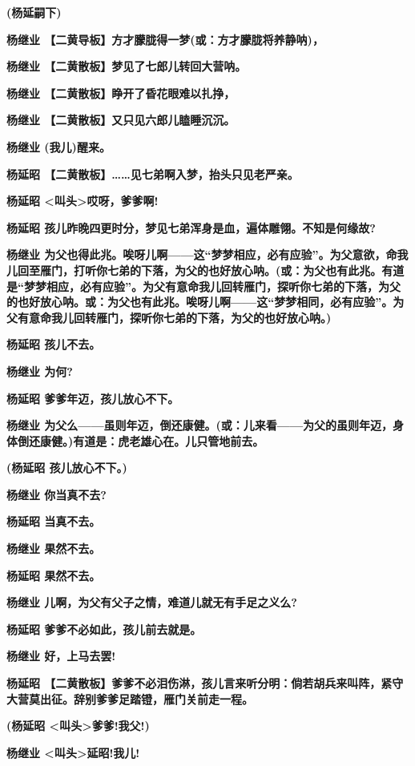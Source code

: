\textbf{(杨延嗣下)}

\textbf{杨继业 【二黄导板】方才朦胧得一梦(或：方才朦胧将养静呐)，}

\textbf{杨继业 【二黄散板】梦见了七郎儿转回大营呐。}

\textbf{杨继业 【二黄散板】睁开了昏花眼难以扎挣，}

\textbf{杨继业 【二黄散板】又只见六郎儿瞌睡沉沉。}

\textbf{杨继业 (我儿)醒来。}

\textbf{杨延昭
【二黄散板】\ldots{}\ldots{}见七弟啊入梦，抬头只见老严亲。}

\textbf{杨延昭 \textless{}叫头\textgreater{}哎呀，爹爹啊!}

\textbf{杨延昭
孩儿昨晚四更时分，梦见七弟浑身是血，遍体雕翎。不知是何缘故?}

\textbf{杨继业
为父也得此兆。唉呀儿啊------这``梦梦相应，必有应验''。为父意欲，命我儿回至雁门，打听你七弟的下落，为父的也好放心呐。(或：为父也有此兆。有道是``梦梦相应，必有应验''。为父有意命我儿回转雁门，探听你七弟的下落，为父的也好放心呐。或：为父也有此兆。唉呀儿啊------这``梦梦相同，必有应验''。为父有意命我儿回转雁门，探听你七弟的下落，为父的也好放心呐。)}

\textbf{杨延昭 孩儿不去。}

\textbf{杨继业 为何?}

\textbf{杨延昭 爹爹年迈，孩儿放心不下。}

\textbf{杨继业
为父么------虽则年迈，倒还康健。(或：儿来看------为父的虽则年迈，身体倒还康健。)有道是：虎老雄心在。儿只管地前去。}

\textbf{(杨延昭 孩儿放心不下。)}

\textbf{杨继业 你当真不去?}

\textbf{杨延昭 当真不去。}

\textbf{杨继业 果然不去。}

\textbf{杨延昭 果然不去。}

\textbf{杨继业 儿啊，为父有父子之情，难道儿就无有手足之义么?}

\textbf{杨延昭 爹爹不必如此，孩儿前去就是。}

\textbf{杨继业 好，上马去罢!}

\textbf{杨延昭
【二黄散板】爹爹不必泪伤淋，孩儿言来听分明：倘若胡兵来叫阵，紧守大营莫出征。辞别爹爹足踏镫，雁门关前走一程。}

\textbf{(杨延昭 \textless{}叫头\textgreater{}爹爹!我父!)}

\textbf{杨继业 \textless{}叫头\textgreater{}延昭!我儿!}

